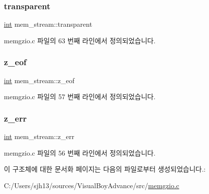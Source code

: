 \subsubsection{\texorpdfstring{transparent}{transparent}}
{\footnotesize\ttfamily \mbox{\hyperlink{_util_8cpp_a0ef32aa8672df19503a49fab2d0c8071}{int}} mem\+\_\+stream\+::transparent}



memgzio.\+c 파일의 63 번째 라인에서 정의되었습니다.

\mbox{\label{structmem__stream_ac41bfcdbcada66bebb9709e8638f6b80}} 
\subsubsection{\texorpdfstring{z\+\_\+eof}{z\_eof}}
{\footnotesize\ttfamily \mbox{\hyperlink{_util_8cpp_a0ef32aa8672df19503a49fab2d0c8071}{int}} mem\+\_\+stream\+::z\+\_\+eof}



memgzio.\+c 파일의 57 번째 라인에서 정의되었습니다.

\mbox{\label{structmem__stream_a0049d60995cda5d1638ebce2a4eb3155}} 
\subsubsection{\texorpdfstring{z\+\_\+err}{z\_err}}
{\footnotesize\ttfamily \mbox{\hyperlink{_util_8cpp_a0ef32aa8672df19503a49fab2d0c8071}{int}} mem\+\_\+stream\+::z\+\_\+err}



memgzio.\+c 파일의 56 번째 라인에서 정의되었습니다.



이 구조체에 대한 문서화 페이지는 다음의 파일로부터 생성되었습니다.\+:\begin{DoxyCompactItemize}
\item 
C\+:/\+Users/sjh13/sources/\+Visual\+Boy\+Advance/src/\mbox{\hyperlink{memgzio_8c}{memgzio.\+c}}\end{DoxyCompactItemize}
